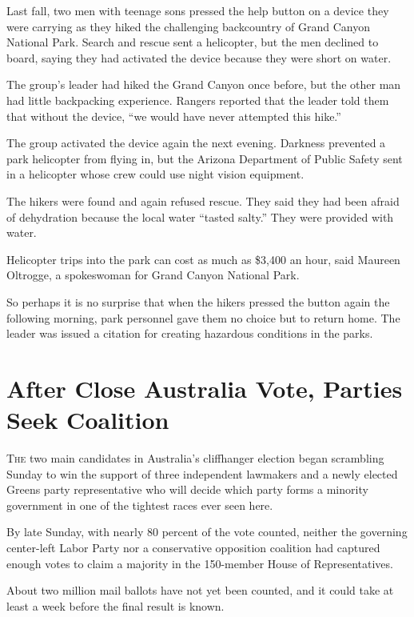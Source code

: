 ﻿\documentclass[12pt]{article}
\begin{document}
Last fall, two men with teenage sons pressed the help button on a device they were carrying as they
hiked the challenging backcountry of Grand Canyon National Park. Search and rescue sent a
helicopter, but the men declined to board, saying they had activated the device because they were
short on water.

The group's leader had hiked the Grand Canyon once before, but the other man had little backpacking
experience. Rangers reported that the leader told them that without the device, ``we would have
never attempted this hike.''

The group activated the device again the next evening. Darkness prevented a park helicopter from
flying in, but the Arizona Department of Public Safety sent in a helicopter whose crew could use
night vision equipment.

The hikers were found and again refused rescue. They said they had been afraid of dehydration
because the local water ``tasted salty.'' They were provided with water.

Helicopter trips into the park can cost as much as \$3,400 an hour, said Maureen Oltrogge, a
spokeswoman for Grand Canyon National Park.

So perhaps it is no surprise that when the hikers pressed the button again the following morning,
park personnel gave them no choice but to return home. The leader was issued a citation for creating
hazardous conditions in the parks.

\pagebreak
\section{After Close Australia Vote, Parties Seek Coalition}

\lettrine{T}{he} two main candidates in Australia's cliffhanger election
began scrambling Sunday to win the support of three independent lawmakers and a newly elected Greens
party representative who will decide which party forms a minority government in one of the tightest
races ever seen here.

By late Sunday, with nearly 80 percent of the vote counted, neither the governing center-left Labor
Party nor a conservative opposition coalition had captured enough votes to claim a majority in the
150-member House of Representatives.

About two million mail ballots have not yet been counted, and it could take at least a week before
the final result is known.
\end{document}
